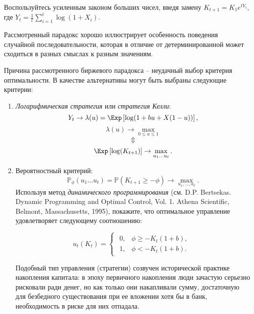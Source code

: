 \begin{ordre}
Воспользуйтесь усиленным законом больших чисел, введя замену $K_{t+1} = K_1 e^{t Y_t}$, где  $Y_t = \frac{1}{t} \sum \limits_{i=1}^{t}\log(1+X_i)$. 
\end{ordre}

\begin{remark}
Рассмотренный парадокс хорошо иллюстрирует особенность поведения случайной последовательности, которая в отличие от детерминированной может сходиться в разных смыслах к разным значениям. 
\end{remark}

Причина рассмотренного биржевого парадокса -- неудачный выбор критерия оптимальности. В качестве альтернативы могут быть выбраны следующие критерии:

\begin{enumerate}
\item \textit{Логарифмическая стратегия} или \textit{стратегия Келли}:
\[
Y_t \rightarrow \lambda(u) = \Exp\left[ \log (1 + b u + X (1-u)) \right],
\]
\[
\lambda(u) \rightarrow \max \limits_{ 0 \leq u \leq 1}
\]
\[
\Updownarrow
\]
\[
\Exp\left[ \log (K_{t+1}) \right] \rightarrow \max \limits_{ u_1 \ldots u_t }.
\]

\item Вероятностный критерий:
\[
\mathbb{P}_\phi (u_1 \ldots u_t ) = \mathbb{P} (K_{t+1} \geq -\phi) \rightarrow \max \limits_{ u_1, \ldots, u_t }.
\]
Используя метод \textit{динамического программирования} (см. D.P. Bertsekas. Dynamic Programming and Optimal Control, Vol. 1.  Athena Scientific, Belmont, Massachusetts, 1995), покажите, что оптимальное управление удовлетворяет следующему соотношению: 

\[
u_t(K_t) = \begin{cases}
\begin{array}{cc}
0, & \phi \geq - K_t(1+b), \\
1, & \phi < - K_t(1+b).
\end{array}\end{cases}
\]

\begin{remark}
Подобный тип управления (стратегии) созвучен исторической практике накопления капитала: в эпоху первичного накопления люди зачастую серьезно рисковали ради денег, но как только они накапливали сумму, достаточную для безбедного существования при ее вложении хотя бы в банк, необходимость в риске для них отпадала.  
\end{remark} 
 
\end{enumerate}


